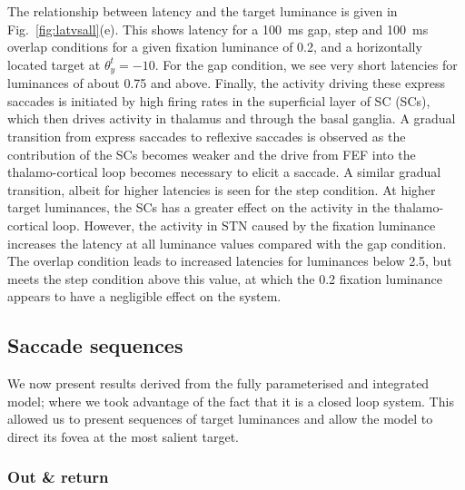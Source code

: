 \documentclass{frontiersSCNS}
\begin{document}
The relationship between latency and the target luminance is given in
Fig.~\ref{fig:latvsall}(e). This shows latency for a 100~ms gap, step
and 100~ms overlap conditions for a given fixation luminance of 0.2,
and a horizontally located target at $\theta_{y}^{t}=\mathrm{-10}$\dg. For the
gap condition, we see very short latencies for luminances of about
0.75 and above.  Finally, the activity driving these express saccades
is initiated by high firing rates in the superficial layer of SC
(SCs), which then drives activity in thalamus and through the basal
ganglia. A gradual transition from express saccades to reflexive
saccades is observed as the contribution of the SCs becomes weaker and
the drive from FEF into the thalamo-cortical loop becomes necessary to
elicit a saccade.
%
A similar gradual transition, albeit for higher latencies is seen for
the step condition. At higher target luminances, the SCs has a greater
effect on the activity in the thalamo-cortical loop. However, the
activity in STN caused by the fixation luminance increases the latency
at all luminance values compared with the gap condition.
%
The overlap condition leads to increased latencies for luminances
below 2.5, but meets the step condition above this value, at which the
0.2 fixation luminance appears to have a negligible effect on the
system.

\subsection{Saccade sequences} \label{sec:results:sequences}

We now present results derived from the fully parameterised and
integrated model; where we took advantage of the fact that it is a
closed loop system. This allowed us to present sequences of target
luminances and allow the model to direct its fovea at the most salient
target.

\subsubsection{Out \& return}
\end{document}
